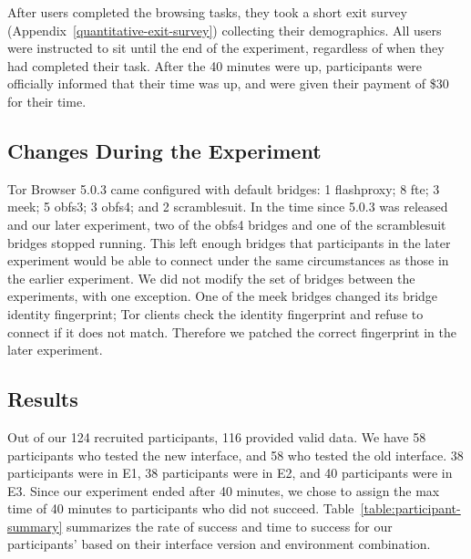\documentclass[USenglish,oneside,twocolumn]{article}
\begin{document}
After users completed the browsing tasks, they took a short exit survey (Appendix~\ref{quantitative-exit-survey})
collecting their demographics. All users were instructed to sit until the end of the experiment,
regardless of when they had completed their task. After the 40 minutes were up, 
participants were officially informed that their time was up, and were given their payment of 
\$30 for their time. 

\subsection{Changes During the Experiment} 

Tor Browser 5.0.3 came configured with default bridges:
1 flashproxy;
8 fte;
3 meek;
5 obfs3;
3 obfs4;
and 2 scramblesuit.
In the time since 5.0.3 was released and our later experiment,
two of the obfs4 bridges and one of the scramblesuit bridges stopped running.
This left enough bridges that participants in the later experiment would be able to connect
under the same circumstances as those in the earlier experiment.
We did not modify the set of bridges between the experiments,
with one exception.
One of the meek bridges changed its bridge identity fingerprint;
Tor clients check the identity fingerprint and refuse to connect
if it does not match.
Therefore we patched the correct fingerprint in the later experiment.

\subsection{Results} 
Out of our 124 recruited participants, 116 provided valid data. We have 58 participants who tested the new interface, and 58 who tested the old interface. 38 participants were in E1, 38 participants were in E2, and 40 participants were in E3. Since our experiment ended after 40 minutes, we chose to assign the max time of 40 minutes to participants who did not succeed. Table~\ref{table:participant-summary} summarizes the rate of success and time to success for our participants' based on their interface version and environment combination. 
\end{document}
